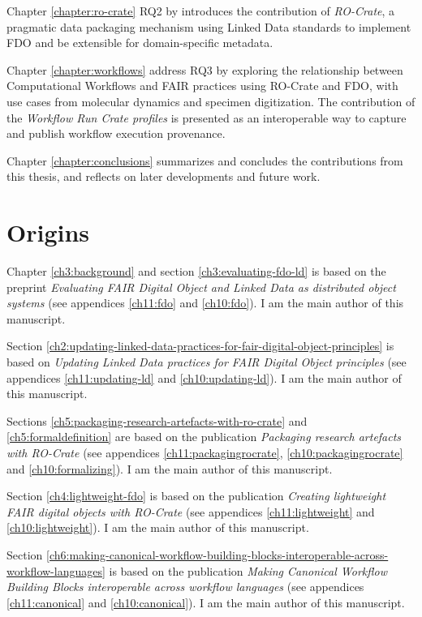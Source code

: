 Chapter \vref{chapter:ro-crate} RQ2 by introduces the contribution of \emph{RO-Crate}, a pragmatic data packaging mechanism using Linked Data standards to implement FDO and be extensible for domain-specific metadata.  

Chapter \vref{chapter:workflows} address RQ3 by exploring the relationship between Computational Workflows and FAIR practices using RO-Crate and FDO, with use cases from molecular dynamics and specimen digitization. The contribution of the \emph{Workflow Run Crate profiles} is presented as an interoperable way to capture and publish workflow execution provenance. 

Chapter \vref{chapter:conclusions} summarizes and concludes the contributions from this thesis, and reflects on later developments and future work.


\section{Origins}

Chapter \ref{ch3:background} and section \ref{ch3:evaluating-fdo-ld} is based on the preprint \emph{Evaluating FAIR Digital Object and Linked Data as distributed object systems} \cite{soilandreyes2023c}  (see appendices \vref{ch11:fdo} and \vref{ch10:fdo}). I am the main author of this manuscript.

Section \ref{ch2:updating-linked-data-practices-for-fair-digital-object-principles} is based on \emph{Updating Linked Data practices for FAIR Digital Object principles} \cite{10.3897/rio.8.e94501} (see appendices \ref{ch11:updating-ld} and \ref{ch10:updating-ld}). I am the main author of this manuscript.

Sections \ref{ch5:packaging-research-artefacts-with-ro-crate} and \vref{ch5:formaldefinition} are based on the publication \emph{Packaging research artefacts with RO-Crate} \cite{Soiland-Reyes 2022} (see appendices \ref{ch11:packagingrocrate}, \ref{ch10:packagingrocrate} and \ref{ch10:formalizing}). I am the main author of this manuscript.

Section \ref{ch4:lightweight-fdo} is based on the publication \emph{Creating lightweight FAIR digital objects with RO-Crate} \cite{10.3897/rio.8.e93937} (see appendices \ref{ch11:lightweight} and \ref{ch10:lightweight}). I am the main author of this manuscript.

Section \ref{ch6:making-canonical-workflow-building-blocks-interoperable-across-workflow-languages} is based on the publication \emph{Making Canonical Workflow Building Blocks interoperable across workflow languages} \cite{Soiland-Reyes 2022b} (see appendices \ref{ch11:canonical} and \ref{ch10:canonical}). I am the main author of this manuscript.


